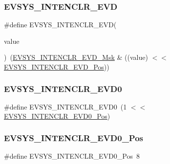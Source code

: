 \subsubsection{\texorpdfstring{EVSYS\_INTENCLR\_EVD}{EVSYS\_INTENCLR\_EVD}}
{\footnotesize\ttfamily \#define E\+V\+S\+Y\+S\+\_\+\+I\+N\+T\+E\+N\+C\+L\+R\+\_\+\+E\+VD(\begin{DoxyParamCaption}\item[{}]{value }\end{DoxyParamCaption})~(\mbox{\hyperlink{group___s_a_m_d21___e_v_s_y_s_ga8f32e9de4a9c91b99b05dfede7021443}{E\+V\+S\+Y\+S\+\_\+\+I\+N\+T\+E\+N\+C\+L\+R\+\_\+\+E\+V\+D\+\_\+\+Msk}} \& ((value) $<$$<$ \mbox{\hyperlink{group___s_a_m_d21___e_v_s_y_s_ga8a3e372d57cf13788515873930cf5657}{E\+V\+S\+Y\+S\+\_\+\+I\+N\+T\+E\+N\+C\+L\+R\+\_\+\+E\+V\+D\+\_\+\+Pos}}))}

\mbox{\label{group___s_a_m_d21___e_v_s_y_s_gabafb6938bb647b456d9ab61686113d50}} 
\subsubsection{\texorpdfstring{EVSYS\_INTENCLR\_EVD0}{EVSYS\_INTENCLR\_EVD0}}
{\footnotesize\ttfamily \#define E\+V\+S\+Y\+S\+\_\+\+I\+N\+T\+E\+N\+C\+L\+R\+\_\+\+E\+V\+D0~(1 $<$$<$ \mbox{\hyperlink{group___s_a_m_d21___e_v_s_y_s_ga3ba80aa7fc515424670c352a69f6ffa7}{E\+V\+S\+Y\+S\+\_\+\+I\+N\+T\+E\+N\+C\+L\+R\+\_\+\+E\+V\+D0\+\_\+\+Pos}})}

\mbox{\label{group___s_a_m_d21___e_v_s_y_s_ga3ba80aa7fc515424670c352a69f6ffa7}} 
\subsubsection{\texorpdfstring{EVSYS\_INTENCLR\_EVD0\_Pos}{EVSYS\_INTENCLR\_EVD0\_Pos}}
{\footnotesize\ttfamily \#define E\+V\+S\+Y\+S\+\_\+\+I\+N\+T\+E\+N\+C\+L\+R\+\_\+\+E\+V\+D0\+\_\+\+Pos~8}



